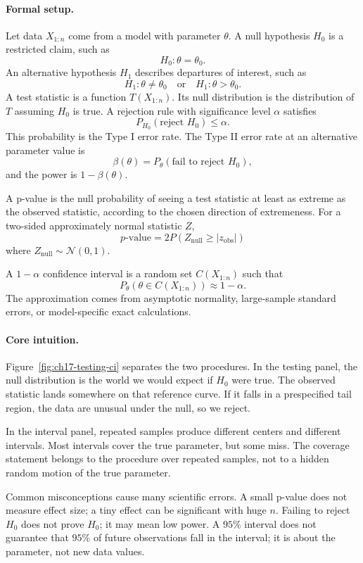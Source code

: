 \paragraph{Formal setup.}
Let data \(X_{1:n}\) come from a model with parameter \(\theta\). A null hypothesis \(H_0\) is a restricted claim, such as
\[
H_0:\theta=\theta_0.
\]
An alternative hypothesis \(H_1\) describes departures of interest, such as
\[
H_1:\theta\neq\theta_0
\quad\text{or}\quad
H_1:\theta>\theta_0.
\]
A test statistic is a function \(T(X_{1:n})\). Its null distribution is the distribution of \(T\) assuming \(H_0\) is true. A rejection rule with significance level \(\alpha\) satisfies
\[
\boxed{
P_{H_0}(\text{reject }H_0)\leq\alpha.
}
\]
This probability is the Type I error rate. The Type II error rate at an alternative parameter value is
\[
\beta(\theta)=P_\theta(\text{fail to reject }H_0),
\]
and the power is \(1-\beta(\theta)\).

A p-value is the null probability of seeing a test statistic at least as extreme as the observed statistic, according to the chosen direction of extremeness. For a two-sided approximately normal statistic \(Z\),
\[
\boxed{
p\text{-value}=2P(Z_{\mathrm{null}}\geq |z_{\mathrm{obs}}|)
}
\]
where \(Z_{\mathrm{null}}\sim\mathcal N(0,1)\).

A \(1-\alpha\) confidence interval is a random set \(C(X_{1:n})\) such that
\[
\boxed{
P_\theta(\theta\in C(X_{1:n}))\approx 1-\alpha.
}
\]
The approximation comes from asymptotic normality, large-sample standard errors, or model-specific exact calculations.

\paragraph{Core intuition.}
Figure~\ref{fig:ch17-testing-ci} separates the two procedures. In the testing panel, the null distribution is the world we would expect if \(H_0\) were true. The observed statistic lands somewhere on that reference curve. If it falls in a prespecified tail region, the data are unusual under the null, so we reject.

In the interval panel, repeated samples produce different centers and different intervals. Most intervals cover the true parameter, but some miss. The coverage statement belongs to the procedure over repeated samples, not to a hidden random motion of the true parameter.

Common misconceptions cause many scientific errors. A small p-value does not measure effect size; a tiny effect can be significant with huge \(n\). Failing to reject \(H_0\) does not prove \(H_0\); it may mean low power. A \(95\%\) interval does not guarantee that \(95\%\) of future observations fall in the interval; it is about the parameter, not new data values.

